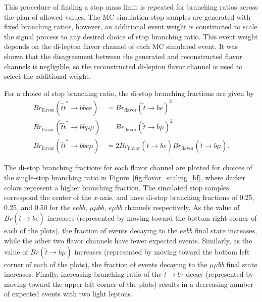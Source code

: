 This procedure of finding a stop mass limit is repeated for branching ratios
across the plan of allowed values.
The MC simulation stop samples are generated with fixed branching
ratios, however, an additional event weight is constructed to scale the signal
process to any desired choice of stop branching ratio.
This event weight depends on the di-lepton flavor channel of each MC simulated
event.
It was shown that the disagreement between the generated and reconstructed
flavor channels is negligible, so the reconstructed di-lepton flavor channel
is used to select the additional weight.

For a choice of stop branching ratio, the di-stop branching fractions are given
by 
\begin{equation}
  \label{eqn:branching_fractions}
  \begin{aligned}
    Br_\mathrm{flavor}(\tilde{t}\tilde{t}^{*} \rightarrow bbee)     &=
      Br_\mathrm{flavor}(\tilde{t} \rightarrow be )^{2} \\
    Br_\mathrm{flavor}(\tilde{t}\tilde{t}^{*} \rightarrow bb\mu\mu) &=
      Br_\mathrm{flavor}(\tilde{t} \rightarrow b\mu )^{2} \\
    Br_\mathrm{flavor}(\tilde{t}\tilde{t}^{*} \rightarrow bbe\mu)   &=
      2Br_\mathrm{flavor}(\tilde{t} \rightarrow be )
      Br_\mathrm{flavor}(\tilde{t} \rightarrow b\mu ).
  \end{aligned}
\end{equation}

The di-stop branching fractions for each flavor channel are plotted for choices
of the single-stop branching ratio in Figure~\ref{fig:flavor_scaling_bf}, where
darker colors represent a higher branching fraction.
The simulated stop samples correspond the center of the $x$-axis, and have
di-stop branching fractions of 0.25, 0.25, and 0.50 for the $eebb$,
$\mu\mu bb$, $e\mu bb$ channels respectively.
As the value of $Br(\tilde{t} \to be)$ increases (represented by moving toward
the bottom right corner of each of the plots), the fraction of events decaying
to the $eebb$ final state increases, while the other two flavor channels
have fewer expected events.
Similarly, as the value of $Br(\tilde{t} \to b\mu)$ increases (represented by
moving toward the bottom left corner of each of the plots), the fraction of
events decaying to the $\mu\mu bb$ final state increases.
Finally, increasing branching ratio of the $\tilde{t} \to b\tau$ decay
(represented by moving toward the upper left corner of the plots) results in a
decreasing number of expected events with two light leptons.

